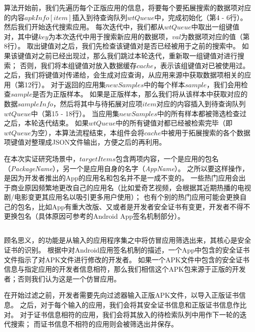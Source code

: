 算法开始前，我们先遍历每个正版应用的信息，将要每个要拓展搜索的数据项对应的内容$apkInfo[item]$插入到待查询队列$wtQueue$中，完成初始化（第4 - 6行）。
然后我们开始迭代搜索应用。
每次迭代中，我们都从$wtQueue$中取出一组键值对，其中键$key$为本次迭代中用于搜索新应用的数据项，$val$为数据项对应的值（第8行）。
取出键值对之后，我们先检查该键值对是否已经被用于之前的搜索中。
如果该键值对之前已经出现过，那么我们跳过本轮迭代，重新取一组键值对进行搜索；
否则，我们将本组键值对放入数据缓存$cache$，表示该组键值对已被使用过。
之后，我们将键值对传递给\componentA ，\componentA 会生成对应查询，从应用来源中获取数据项相关的应用（第12行）。
对于\componentA 返回的应用集$newSamples$中的每个样本$sample$，我们会用\componentC 检查$sample$是否为正版样本。
如果是正版样本，那么我们将从该样本中获取对应的数据$sampleInfo$，然后将其中与待拓展对应项$item$对应的内容插入到待查询队列$wtQueue$中（第15 - 18行）。
当应用集$newSamples$中的所有样本都被筛选检查过之后，本轮迭代结束。
如果$wtQueue$中的所有键值对都已经被检索完毕（即$wtQueue$为空），本算法流程结束，本组件会将$cache$中被用于拓展搜索的各个数据项键值对整理成JSON文件输出，方便之后的再利用。

在本次实证研究场景中，$targetItems$包含两项内容，一个是应用的包名（\emph{PackageName}），另一个是应用自身的名字（\emph{AppName}）。
之所以要这样操作，是因为开发者推出的App的应用名和包名并不是一成不变的。
一些热门应用会出于商业原因频繁地更改自己的应用名（比如爱奇艺视频，会根据其近期热播的电视剧/电影变更其应用名以吸引更多用户使用）；
也有个别的热门应用可能会更换自己的包名，比如App有重大改版、又或者是开发者安全证书有变更，开发者不得不更换包名（具体原因可参考的Android App签名机制部分）。

\subsection{\componentC }
顾名思义，\componentC 的功能是从输入的应用程序集之中将仿冒应用筛选出来，其核心是安全证书的识别。
根据中对Android应用签名机制的描述，一个App中包含的安全证书文件指示了对APK文件进行修改的开发者。
如果一个APK文件中包含的安全证书信息与指定应用的开发者信息相符，那么我们相信这个APK包来源于正版的开发者；否则我们认为这是一个仿冒应用。

在开始过滤之前，开发者需要先向过滤器输入正版APK文件，以导入正版证书信息。
之后，对于每个输入的应用，我们会将其安全证书信息和正版证书信息作比对。
对于证书信息相符的应用，我们会将其放入\componentB 的待检索队列中用作下一轮的迭代搜索；
而证书信息不相符的应用则会被筛选出并保存。

